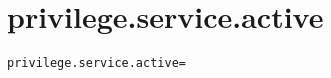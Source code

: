\section{privilege.service.active}
\label{configuration:PrivilegeServiceActive}
\AvailableInCsharpOnly{\TODO}
\begin{lstlisting}[style=Props,caption={Usage example for \textit{privilege.service.active}}]
privilege.service.active=
\end{lstlisting}